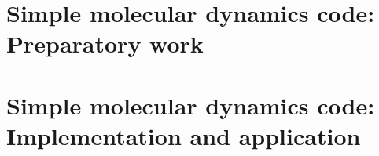 \documentclass[11 pt]{article}
\begin{document}
    \section{Simple molecular dynamics code: Preparatory work}
        

    \clearpage
    \section{Simple molecular dynamics code: Implementation and application}
        
\end{document}
